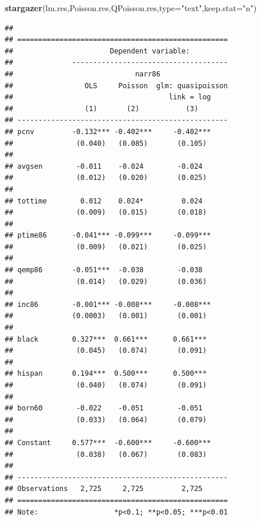 \documentclass[]{book}
\newenvironment{Shaded}{\begin{snugshade}}{\end{snugshade}}
\newcommand{\DataTypeTok}[1]{\textcolor[rgb]{0.13,0.29,0.53}{#1}}
\newcommand{\KeywordTok}[1]{\textcolor[rgb]{0.13,0.29,0.53}{\textbf{#1}}}
\newcommand{\NormalTok}[1]{#1}
\newcommand{\StringTok}[1]{\textcolor[rgb]{0.31,0.60,0.02}{#1}}
\begin{document}
\begin{Shaded}
\begin{Highlighting}[]
\KeywordTok{stargazer}\NormalTok{(lm.res,Poisson.res,QPoisson.res,}\DataTypeTok{type=}\StringTok{"text"}\NormalTok{,}\DataTypeTok{keep.stat=}\StringTok{"n"}\NormalTok{)}
\end{Highlighting}
\end{Shaded}

\begin{verbatim}
## 
## ==================================================
##                       Dependent variable:         
##              -------------------------------------
##                             narr86                
##                 OLS     Poisson  glm: quasipoisson
##                                     link = log    
##                 (1)       (2)           (3)       
## --------------------------------------------------
## pcnv         -0.132*** -0.402***     -0.402***    
##               (0.040)   (0.085)       (0.105)     
##                                                   
## avgsen        -0.011    -0.024        -0.024      
##               (0.012)   (0.020)       (0.025)     
##                                                   
## tottime        0.012    0.024*         0.024      
##               (0.009)   (0.015)       (0.018)     
##                                                   
## ptime86      -0.041*** -0.099***     -0.099***    
##               (0.009)   (0.021)       (0.025)     
##                                                   
## qemp86       -0.051***  -0.038        -0.038      
##               (0.014)   (0.029)       (0.036)     
##                                                   
## inc86        -0.001*** -0.008***     -0.008***    
##              (0.0003)   (0.001)       (0.001)     
##                                                   
## black        0.327***  0.661***      0.661***     
##               (0.045)   (0.074)       (0.091)     
##                                                   
## hispan       0.194***  0.500***      0.500***     
##               (0.040)   (0.074)       (0.091)     
##                                                   
## born60        -0.022    -0.051        -0.051      
##               (0.033)   (0.064)       (0.079)     
##                                                   
## Constant     0.577***  -0.600***     -0.600***    
##               (0.038)   (0.067)       (0.083)     
##                                                   
## --------------------------------------------------
## Observations   2,725     2,725         2,725      
## ==================================================
## Note:                  *p<0.1; **p<0.05; ***p<0.01
\end{verbatim}
\end{document}
